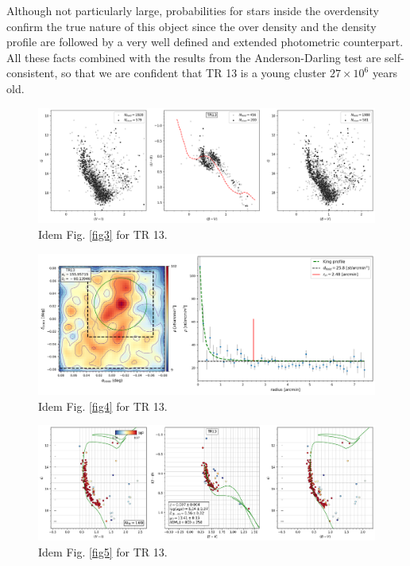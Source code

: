 \documentclass[draft]{aa}
\begin{document}
Although not particularly large, probabilities for stars inside the
overdensity confirm the true nature of this object since the over density
and the density profile are followed by a very well defined and extended
photometric counterpart. All these facts combined with the results from the
Anderson-Darling test are self-consistent, so that we are confident that
TR 13 is a young cluster $27\times10^6$ years old.

\begin{figure}[ht]
    \centering
    \includegraphics[width=\hsize]{../figs/obs_TR13.png}
    \caption{Idem Fig. \ref{fig3} for TR 13.}
    \label{fig39}
\end{figure}
\begin{figure}[ht]
    \centering
    \includegraphics[width=\hsize]{../figs/dmap_trumpler13.png}
    \caption{Idem Fig. \ref{fig4} for TR 13.}
    \label{fig40}
\end{figure}
\begin{figure}[ht]
    \centering
    \includegraphics[width=\hsize]{../figs/cmds_tr13.png}
    \caption{Idem Fig. \ref{fig5} for TR 13.}
    \label{fig41}
\end{figure}
\end{document}
